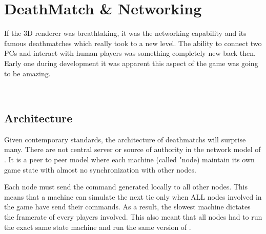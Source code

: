 \pagebreak
\section{DeathMatch \& Networking}
If the 3D renderer was breathtaking, it was the networking capability and its famous deathmatches which really took \doom to a new level. The ability to connect two PCs and interact with human players was something completely new back then. Early one during development it was apparent this aspect of the game was going to be amazing.\\
\par
{}\\
\par

\subsection{Architecture}
Given contemporary standards, the architecture of deathmatchs will surprise many. There are not central server or source of authority in the network model of \doom. It is a peer to peer model where each machine (called "node) maintain its own game state with almost no synchronization with other nodes.\\
\par
{}
\par
 Each node must send the command generated locally to all other nodes. This means that a machine can simulate the next tic only when ALL nodes involved in the game have send their commands. As a result, the slowest machine dictates the framerate of every players involved. This also meant that all nodes had to run the exact same state machine and run the same version of \doom.\\
\par


